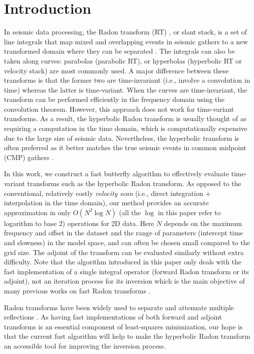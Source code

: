 

\section{Introduction}

In seismic data processing, the Radon transform (RT) \citep{Radon17}, or slant stack, is a set of line integrals that map mixed and overlapping events in seismic gathers to a new transformed domain where they can be separated \citep{GL91}. The integrals can also be taken along curves: parabolas (parabolic RT), or hyperbolas (hyperbolic RT or velocity stack) are most commonly used. A major difference between these transforms is that the former two are time-invariant (i.e., involve a convolution in time) whereas the latter is time-variant. When the curves are time-invariant, the transform can be performed efficiently in the frequency domain using the convolution theorem. However, this approach does not work for time-variant transforms. As a result, the hyperbolic Radon transform is usually thought of as requiring a computation in the time domain, which is computationally expensive due to the large size of seismic data. Nevertheless, the hyperbolic transform is often preferred as it better matches the true seismic events in common midpoint (CMP) gathers \citep{TC85}.

In this work, we construct a fast butterfly algorithm to effectively evaluate time-variant transforms such as the hyperbolic Radon transform. As opposed to the conventional, relatively costly {\it velocity scan} (i.e., direct integration + interpolation in the time domain), our method provides an accurate approximation in only $O(N^2\log N)$ (all the $\log$ in this paper refer to logarithm to base 2) operations for 2D data. Here $N$ depends on the maximum frequency and offset in the dataset and the range of parameters (intercept time and slowness) in the model space, and can often be chosen small compared to the grid size. The adjoint of the transform can be evaluated similarly without extra difficulty. Note that the algorithm introduced in this paper only deals with the fast implementation of a single integral operator (forward Radon transform or its adjoint), not an iteration process for its inversion which is the main objective of many previous works on fast Radon transforms \citep{Sacchi96, Trad01, LS02, WN09}.

Radon transforms have been widely used to separate and attenuate multiple reflections \citep{Hampson86, Yilmaz89, FM92, Herrmann00, MK02, Hargreaves03, Trad03}. As having fast implementations of both forward and adjoint transforms is an essential component of least-squares minimization, our hope is that the current fast algorithm will help to make the hyperbolic Radon transform an accessible tool for improving the inversion process.

